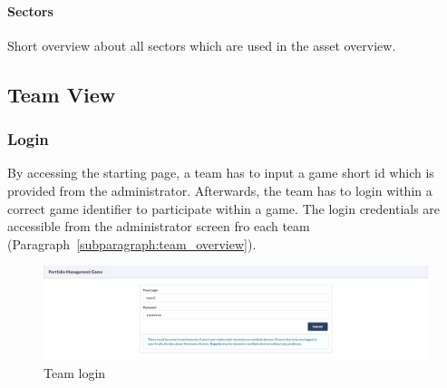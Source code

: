 \paragraph{Sectors}
Short overview about all sectors which are used in the asset overview.





\subsection{Team View}

\subsubsection{Login}
By accessing the starting page, a team has to input a game short id which is provided from the administrator. Afterwards, the team has to login within a correct game identifier to participate within a game. The login credentials are accessible from the administrator screen fro each team (Paragraph~\ref{subparagraph:team_overview}).
\begin{figure}[h!]
  \centering
  \includegraphics[scale=0.2]{img/application-overview/teams/01_login.png}
  \caption{Team login}
\end{figure}

